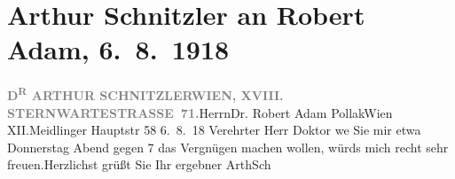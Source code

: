 

         
         \renewcommand{\erwaehntePersonen}{Personen: Robert Adam}
         \renewcommand{\erwaehnteOrte}{Orte: Meidlinger Hauptstraße, Sternwartestraße, VIII., Josefstadt, Wien, XII., Meidling}
         \renewcommand{\erwaehnteWerke}{}
               \section[Arthur Schnitzler an Robert Adam, 6. 8. 1918]{ Arthur Schnitzler an Robert Adam, 6. 8. 1918}\nopagebreak{}\rehead{ }\begin{ledgroupsized}[t]{13cm}\normalsize\beginnumbering \toendnotes[C]{\smallbreak\pagebreak[2]} 
\pstart{}{\pb}\textcolor{gray}{\textbf{D\textsuperscript{R} ARTHUR SCHNITZLER}}\pend{}\pstart{}\textcolor{gray}{\textbf{WIEN, XVIII. STERNWARTESTRASSE 71.}}\pend{}{\bigskip}\pstart{}Herrn\pend{}\pstart{}Dr. Robert Adam Pollak\pend{}\pstart{}Wien XII.\pend{}\pstart{}Meidlinger Hauptstr 58\pend{}{\bigskip}\pstart
           \raggedleft{}{\pb}6. 8. 18\pend
           \pstart{}Verehrter Herr Doktor\pend\pstart
           we{\geminationn} Sie mir etwa Donnerstag{ }Abend gegen 7 das Vergnügen machen wollen, würds mich recht
               sehr freuen.\hspace*{1.5em}Herzlichst grüßt Sie Ihr ergebner\pend
           \pstart \spacefill\mbox{ArthSch}\pend{}
         
         \endnumbering{}\end{ledgroupsized}  \newcommand{\dateiname}{L02293}\newcommand{\titel}{Arthur Schnitzler an Robert Adam, 6. 8. 1918}\newcommand{\editorInnen}{Martin Anton Müller und Gerd-Hermann Susen}
      